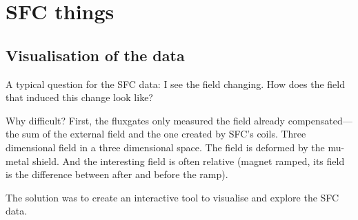 \chapter{SFC things}
\label{ch:sfc_appendix}

\section{Visualisation of the data}
A typical question for the SFC data: I see the field changing. How does the field that induced this change look like?

Why difficult? First, the fluxgates only measured the field already compensated---the sum of the external field and the one created by SFC's coils. Three dimensional field in a three dimensional space. The field is deformed by the mu-metal shield. And the interesting field is often relative (magnet ramped, its field is the difference between after and before the ramp).

The solution was to create an interactive tool to visualise and explore the SFC data.


